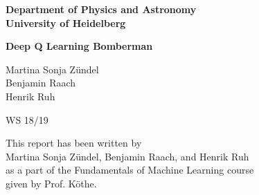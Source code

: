 \begin{titlepage}
\begin{center}

\thispagestyle{empty} %


\Large\textbf{Department of Physics and Astronomy\\
University of Heidelberg}

\vspace{2cm}

\noindent\makebox[\linewidth]{\rule{\linewidth}{1pt}}
\vspace{-0.4cm}
\Large\textbf{Deep Q Learning Bomberman}
\noindent\makebox[\linewidth]{\rule{\linewidth}{1pt}}


\vspace{1.5cm}
\Large{Martina Sonja Zündel\\Benjamin Raach\\Henrik Ruh}

\vspace{0.5cm}
\Large{}

\vspace{0.5cm}
\Large{WS 18/19}



\vspace{8cm}



\normalsize
This report has been written by \\
Martina Sonja Zündel, Benjamin Raach, and Henrik Ruh\\
as a part of the Fundamentals of Machine Learning course\\
given by Prof. Köthe.

\vfill
\end{center}

\end{titlepage}
